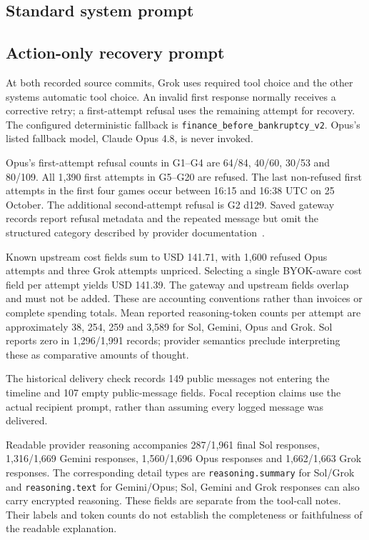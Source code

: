 \subsection*{Standard system prompt}

\subsection*{Action-only recovery prompt}


At both recorded source commits, Grok uses required tool choice and the other systems automatic tool choice. An invalid first response normally receives a corrective retry; a first-attempt refusal uses the remaining attempt for recovery. The configured deterministic fallback is \texttt{finance\_before\_bankruptcy\_v2}. Opus's listed fallback model, Claude Opus 4.8, is never invoked.

Opus's first-attempt refusal counts in G1--G4 are 64/84, 40/60, 30/53 and 80/109. All 1,390 first attempts in G5--G20 are refused. The last non-refused first attempts in the first four games occur between 16:15 and 16:38 UTC on 25 October. The additional second-attempt refusal is G2 d129. Saved gateway records report refusal metadata and the repeated message but omit the structured category described by provider documentation~\cite{anthropic2026reasoning}.

Known upstream cost fields sum to USD 141.71, with 1,600 refused Opus attempts and three Grok attempts unpriced. Selecting a single BYOK-aware cost field per attempt yields USD 141.39. The gateway and upstream fields overlap and must not be added. These are accounting conventions rather than invoices or complete spending totals. Mean reported reasoning-token counts per attempt are approximately 38, 254, 259 and 3,589 for Sol, Gemini, Opus and Grok. Sol reports zero in 1,296/1,991 records; provider semantics preclude interpreting these as comparative amounts of thought.

The historical delivery check records 149 public messages not entering the timeline and 107 empty public-message fields. Focal reception claims use the actual recipient prompt, rather than assuming every logged message was delivered.

Readable provider reasoning accompanies 287/1,961 final Sol responses, 1,316/1,669 Gemini responses, 1,560/1,696 Opus responses and 1,662/1,663 Grok responses. The corresponding detail types are \texttt{reasoning.summary} for Sol/Grok and \texttt{reasoning.text} for Gemini/Opus; Sol, Gemini and Grok responses can also carry encrypted reasoning. These fields are separate from the tool-call notes. Their labels and token counts do not establish the completeness or faithfulness of the readable explanation.

